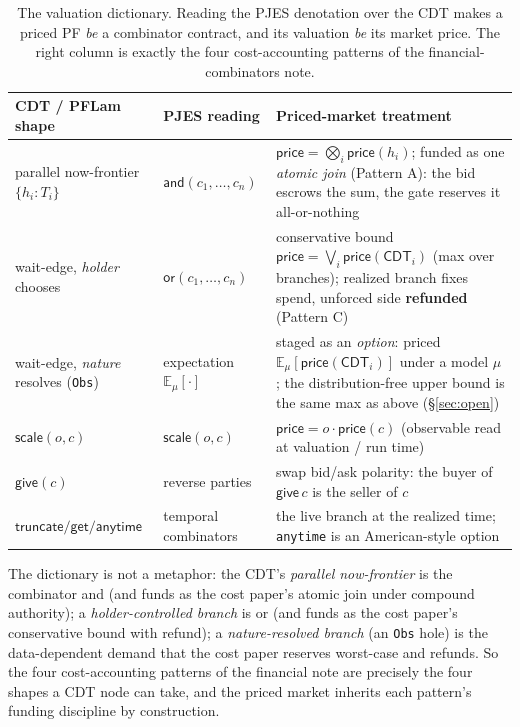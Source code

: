 \documentclass[11pt]{article}
\theoremstyle{definition}
\newcommand{\PF}{\textsf{PF}}
\newcommand{\CDT}{\textsf{CDT}}
\newcommand{\PFLam}{\textsf{PFLam}}
\newcommand{\price}{\ensuremath{\mathsf{price}}}
\newcommand{\now}{\textsf{now}}
\newcommand{\wait}{\textsf{wait}}
\begin{document}
\begin{table}[h]
\centering
\small
\renewcommand{\arraystretch}{1.25}
\begin{tabular}{@{}p{3.3cm}p{2.5cm}p{9.0cm}@{}}
\toprule
\textbf{\CDT{} / \PFLam{} shape} & \textbf{PJES reading} & \textbf{Priced-market treatment} \\
\midrule
parallel \now-frontier $\{h_i:T_i\}$ &
  \(\textsf{and}(c_1,\dots,c_n)\) &
  $\price = \bigotimes_i \price(h_i)$; funded as one \emph{atomic join} (Pattern A): the bid escrows
  the sum, the gate reserves it all-or-nothing \\
\wait-edge, \emph{holder} chooses &
  \(\textsf{or}(c_1,\dots,c_n)\) &
  conservative bound $\price = \bigvee_i \price(\CDT_i)$ (max over branches); realized branch fixes
  spend, unforced side \textbf{refunded} (Pattern C) \\
\wait-edge, \emph{nature} resolves (\texttt{Obs}) &
  expectation $\mathbb{E}_\mu[\cdot]$ &
  staged as an \emph{option}: priced $\mathbb{E}_\mu[\price(\CDT_i)]$ under a model $\mu$; the
  distribution-free upper bound is the same max as above (\S\ref{sec:open}) \\
\(\textsf{scale}(o,c)\) &
  \(\textsf{scale}(o,c)\) &
  $\price = o \cdot \price(c)$ (observable read at valuation / run time) \\
\(\textsf{give}(c)\) &
  reverse parties &
  swap bid/ask polarity: the buyer of \(\textsf{give}\,c\) is the seller of \(c\) \\
\(\textsf{truncate}/\textsf{get}/\textsf{anytime}\) &
  temporal combinators &
  the live branch at the realized time; \texttt{anytime} is an American-style option \\
\bottomrule
\end{tabular}
\caption{The valuation dictionary. Reading the PJES denotation over the \CDT{} makes a priced \PF{}
\emph{be} a combinator contract, and its valuation \emph{be} its market price. The right column is
exactly the four cost-accounting patterns of the financial-combinators note.}
\label{tab:dict}
\end{table}

\noindent The dictionary is not a metaphor: the \CDT{}'s \emph{parallel now-frontier} is the
combinator \textsf{and} (and funds as the cost paper's atomic join under compound authority); a
\emph{holder-controlled branch} is \textsf{or} (and funds as the cost paper's conservative bound with
refund); a \emph{nature-resolved branch} (an \texttt{Obs} hole) is the data-dependent demand that the
cost paper reserves worst-case and refunds. So the four cost-accounting patterns of the financial
note are precisely the four shapes a \CDT{} node can take, and the priced market inherits each
pattern's funding discipline by construction.
\end{document}
